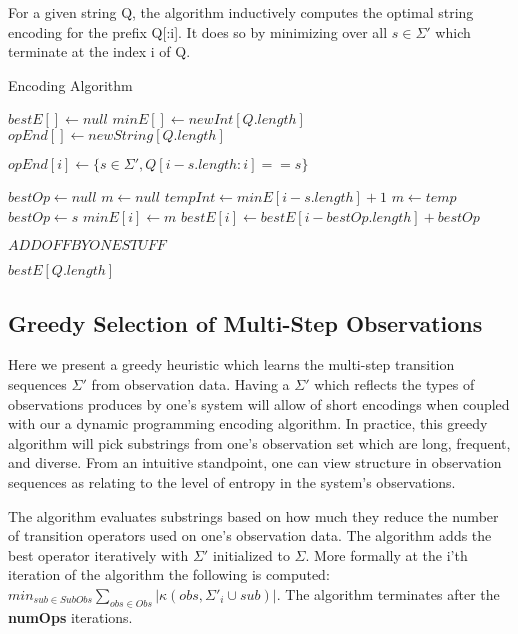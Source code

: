 For a given string Q, the algorithm inductively computes the optimal string encoding for the prefix Q[:i]. It does so by minimizing over all $s \in \Sigma'$ which terminate at the index i of Q.

\begin{algorithm}
\caption{Encoding Algorithm}
\label{Encoding Algorithm}
\begin{algorithmic}[1]

\State $bestE[] \gets null$
\State $minE[] \gets new Int[Q.length]$
\State $opEnd[] \gets new String[Q.length]$

	 \State $opEnd[i] \gets \{s \in \Sigma', Q[i-s.length:i] == s\}$
\EndFor

	\State $bestOp \gets null$
	\State $m \gets null$ 
		\State $tempInt \gets minE[i-s.length] + 1$
			\State $m \gets temp$ 
			\State $bestOp \gets s$
		\EndIf
	\EndFor
	\State $minE[i] \gets m$
	\State $bestE[i] \gets bestE[i-bestOp.length] + bestOp$
\EndFor

$ADD OFF BY ONE STUFF$

\Return $bestE[Q.length]$

\EndProcedure
\end{algorithmic}
\end{algorithm}

\subsection{Greedy Selection of Multi-Step Observations}

Here we present a greedy heuristic which learns the multi-step transition sequences $\Sigma'$ from observation data. Having a $\Sigma'$ which reflects the types of observations produces by one's system will allow of short encodings when coupled with our a dynamic programming encoding algorithm. In practice, this greedy algorithm will pick substrings from one's observation set which are long, frequent, and diverse. From an intuitive standpoint, one can view structure in observation sequences as relating to the level of entropy in the system's observations. 

The algorithm evaluates substrings based on how much they reduce the number of transition operators used on one's observation data. The algorithm adds the best operator iteratively with $\Sigma'$ initialized to $\Sigma$. More formally at the i'th iteration of the algorithm the following is computed: $min_{sub \in SubObs} \sum\nolimits_{obs \in Obs}|\kappa(obs,\Sigma'_i \cup sub)|$. The algorithm terminates after the \textbf{numOps} iterations. 

